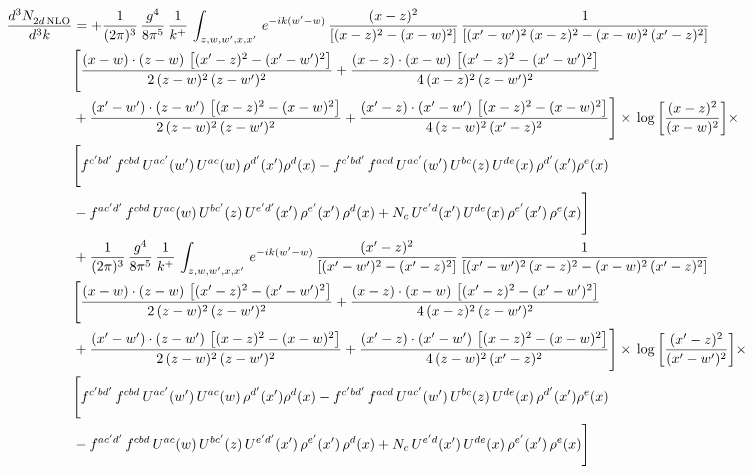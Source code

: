 \documentclass[9pt]{article}
\numberwithin{equation}{section}
\begin{document}
\begin{align}
 \frac{d^{3}N_{2d\,\rm NLO}^{\rm}}{d^{3}k}  & =   +\frac{1}{(2\pi)^{3}}\, \frac{g^{4}}{8\pi^{5}}\,\frac{1}{k^{+}}\,\int_{z,w,w^{\prime},x,x'}\, e^{-ik(w^{\prime}-w)}\,\frac{(x-z)^{2}}{\left[(x-z)^{2}-(x-w)^{2}\right]}\,\frac{1}{\left[(x'-w')^{2}\,(x-z)^{2} - (x-w)^{2}\,(x'-z)^{2}\right]}\notag \\ & \Bigg[\frac{(x-w)\cdot (z-w)\, \left[(x'-z)^{2}-(x'-w')^{2}\right]}{2\, (z-w)^{2}\, (z-w')^{2}}  + \frac{(x-z)\cdot (x-w)\,\left[(x'-z)^{2}-(x'-w')^{2}\right] }{4\,(x-z)^{2}\,(z-w')^{2}}\notag \\ & +\frac{(x'-w')\cdot (z-w')\, \left[(x-z)^{2}-(x-w)^{2}\right]}{2\, (z-w)^{2}\, (z-w')^{2}}+ \frac{(x'-z)\cdot (x'-w')\, \left[(x-z)^{2}-(x-w)^{2}\right]}{4\, (z-w)^{2}\,(x'-z)^{2}}\Bigg]\times\, \log{\left[\frac{(x-z)^{2}}{(x-w)^{2}}\right]} \times\notag \\ & \Bigg[f^{c'bd'}\,f^{cbd}\, U^{ac'}(w')\,U^{ac}(w)\,\rho^{d'}(x')\rho^{d}(x)- f^{c'bd'}\,f^{acd}\,U^{ac'}(w')\,U^{bc}(z)\,U^{de}(x)\,\rho^{d'}(x')\rho^{e}(x) \notag \\ & -f^{ac'd'}\,f^{cbd}\,U^{ac}(w)\,U^{bc'}(z)\,U^{e'd'}(x')\,\rho^{e'}(x')\,\rho^{d}(x) +N_{c}\,U^{e'd}(x')\,U^{de}(x)\,\rho^{e'}(x')\,\rho^{e}(x)\Bigg] \notag \\
& +\frac{1}{(2\pi)^{3}}\, \frac{g^{4}}{8\pi^{5}}\,\frac{1}{k^{+}}\,\int_{z,w,w^{\prime},x,x'}\, e^{-ik(w^{\prime}-w)}\,\frac{(x'-z)^{2}}{\left[(x'-w')^{2}-(x'-z)^{2}\right]}\,\frac{1}{\left[(x'-w')^{2}\,(x-z)^{2} - (x-w)^{2}\,(x'-z)^{2}\right]}\notag \\ & \Bigg[\frac{(x-w)\cdot (z-w)\, \left[(x'-z)^{2}-(x'-w')^{2}\right]}{2\, (z-w)^{2}\, (z-w')^{2}}  + \frac{(x-z)\cdot (x-w)\,\left[(x'-z)^{2}-(x'-w')^{2}\right] }{4\,(x-z)^{2}\,(z-w')^{2}}\notag \\ & +\frac{(x'-w')\cdot (z-w')\, \left[(x-z)^{2}-(x-w)^{2}\right]}{2\, (z-w)^{2}\, (z-w')^{2}}+ \frac{(x'-z)\cdot (x'-w')\, \left[(x-z)^{2}-(x-w)^{2}\right]}{4\, (z-w)^{2}\,(x'-z)^{2}}\Bigg]\times\, \log{\left[\frac{(x'-z)^{2}}{(x'-w')^{2}}\right]} \times\notag \\ & \Bigg[f^{c'bd'}\,f^{cbd}\, U^{ac'}(w')\,U^{ac}(w)\,\rho^{d'}(x')\rho^{d}(x)- f^{c'bd'}\,f^{acd}\,U^{ac'}(w')\,U^{bc}(z)\,U^{de}(x)\,\rho^{d'}(x')\rho^{e}(x) \notag \\ & -f^{ac'd'}\,f^{cbd}\,U^{ac}(w)\,U^{bc'}(z)\,U^{e'd'}(x')\,\rho^{e'}(x')\,\rho^{d}(x) +N_{c}\,U^{e'd}(x')\,U^{de}(x)\,\rho^{e'}(x')\,\rho^{e}(x)\Bigg]
\end{align}
\end{document}
